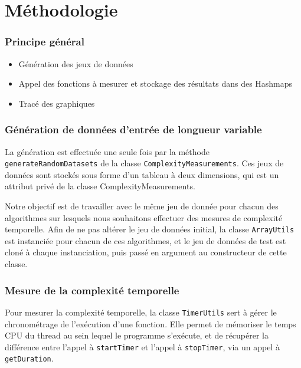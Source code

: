 \part{Méthodologie}

  \section{Principe général}

    \begin{itemize}
      \item Génération des jeux de données
      \item Appel des fonctions à mesurer et stockage des résultats dans des Hashmaps %
      \item Tracé des graphiques
    \end{itemize}

  \section{Génération de données d'entrée de longueur variable}

    La génération est effectuée une seule fois par la méthode \texttt{generateRandomDatasets} de la classe
    \texttt{ComplexityMeasurements}.
    Ces jeux de données sont stockés sous forme d'un tableau à deux dimensions, qui est un attribut privé de la
     classe ComplexityMeasurements.

     Notre objectif est de travailler avec le même jeu de donnée pour chacun des algorithmes
     sur lesquels nous souhaitons effectuer des mesures de complexité temporelle.
   Afin de ne pas altérer le jeu de données initial, la classe \texttt{ArrayUtils} est instanciée pour chacun de ces algorithmes,
   et le jeu de données de test est cloné à chaque instanciation, puis passé en argument au constructeur de
   cette classe.

  \section{Mesure de la complexité temporelle}

    Pour mesurer la complexité temporelle, la classe \texttt{TimerUtils} sert à gérer le chronométrage de l'exécution d'une
    fonction. Elle permet de mémoriser le temps CPU du thread au sein lequel le programme s'exécute, et de récupérer
    la différence entre l'appel à \texttt{startTimer} et l'appel à \texttt{stopTimer}, via un appel à
    \texttt{getDuration}.

